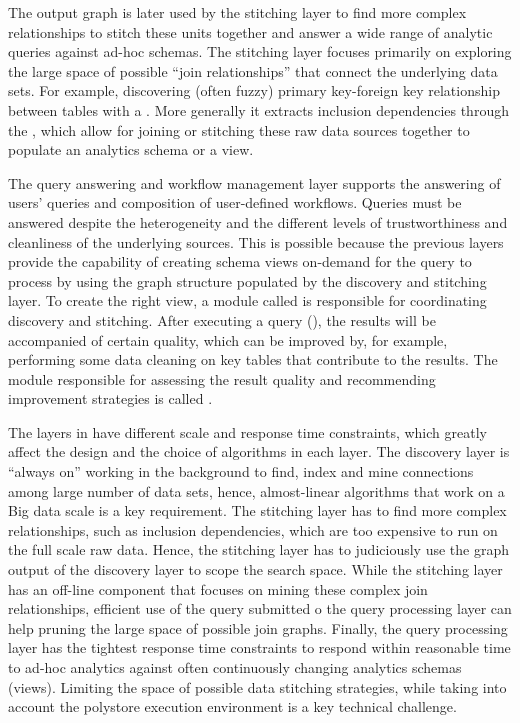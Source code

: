 The output graph is later used by the stitching layer to find more complex
relationships to stitch these units together and answer a wide range of
analytic queries against ad-hoc schemas. The stitching layer focuses primarily on
exploring the large space of possible ``join relationships'' that connect the
underlying data sets. For example, discovering (often fuzzy) primary key-foreign
key relationship between tables with a . More
generally it extracts inclusion dependencies through the ,
which allow for joining or stitching these raw data sources together to populate
an analytics schema or a view. 

The query answering and workflow management layer 
supports the answering of users' queries and composition of user-defined workflows.
Queries must be answered despite the heterogeneity and the different levels of
trustworthiness and cleanliness of the underlying sources. This is possible
because the previous layers provide the capability of creating schema views
on-demand for the query to process by using the graph structure populated by
the discovery and stitching layer. To create the right view, a module
called  is responsible for coordinating discovery
and stitching. After executing a query (), the results will
be accompanied of certain quality, which can be improved by, for example,
performing some data cleaning on key tables that contribute to the results. The
module responsible for assessing the result quality and recommending improvement
strategies is called .

The  layers in \dcv have different scale and response time constraints,
which greatly affect the design and the choice of algorithms in each layer. 
The discovery layer is ``always on'' working in the background to find, index and
mine connections among large number of data sets, hence, almost-linear
algorithms that work on a Big data scale is a key requirement. 
The stitching layer has to find more complex
relationships, such as inclusion dependencies, which are too expensive to run on
the full scale raw data. Hence, the stitching layer has to judiciously use the
graph output of the discovery layer to scope the search space. While the stitching
layer has an off-line component that focuses on mining these complex join
relationships, efficient use of the query submitted o the query processing layer
can help pruning the large space of possible join graphs. 
Finally, the query processing layer has the tightest response time constraints to respond
within reasonable time to ad-hoc analytics against often continuously changing
analytics schemas (views). Limiting the space of possible data stitching
strategies, while taking into account the polystore execution environment is a
key technical challenge. 

